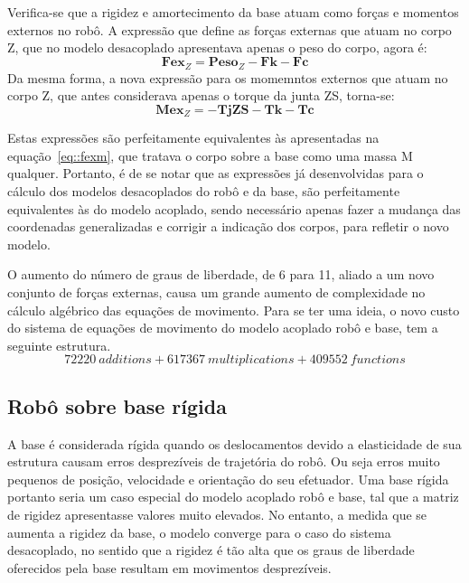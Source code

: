 Verifica-se que a rigidez e amortecimento da base atuam como forças e momentos
externos no robô. A expressão que define as forças externas que atuam no corpo
Z, que no modelo desacoplado apresentava apenas o peso do corpo, agora é:
%
\begin{equation}
	\mathbf{Fex}_Z = \mathbf{Peso}_Z - \mathbf{Fk} - \mathbf{Fc}
\end{equation}
%
Da mesma forma, a nova expressão para os momemntos externos que atuam no corpo
Z, que antes considerava apenas o torque da junta ZS, torna-se:
%
\begin{equation}
	\mathbf{Mex}_Z = -\mathbf{TjZS} - \mathbf{Tk} - \mathbf{Tc}
\end{equation}
%

Estas expressões são perfeitamente equivalentes às apresentadas na
equação~\ref{eq::fexm}, que tratava o corpo sobre a base como uma massa M
qualquer. Portanto, é de se notar que as expressões já desenvolvidas para o
cálculo dos modelos desacoplados do robô e da base, são perfeitamente
equivalentes às do modelo acoplado, sendo necessário apenas fazer a mudança das
coordenadas generalizadas e corrigir a indicação dos corpos, para refletir o
novo modelo.

O aumento do número de graus de liberdade, de 6 para 11, aliado a um novo
conjunto de forças externas, causa um grande aumento de complexidade no
cálculo algébrico das equações de movimento. Para se ter uma ideia, o novo custo
do sistema de equações de movimento do modelo acoplado robô e base, tem a
seguinte estrutura.
%
$$ 72220~\textit{additions} + 617367~\textit{multiplications} + 409552~
\textit{functions} $$
%


\subsection{Robô sobre base rígida}

A base é considerada rígida quando os deslocamentos devido a elasticidade de
sua estrutura causam erros desprezíveis de trajetória do robô. Ou seja erros
muito pequenos de posição, velocidade e orientação do seu efetuador. Uma base
rígida portanto seria um caso especial do modelo acoplado robô e base, tal que a
matriz de rigidez apresentasse valores muito elevados. No entanto, a medida que
se aumenta a rigidez da base, o modelo converge para o caso do sistema
desacoplado, no sentido que a rigidez é tão alta que os graus de liberdade
oferecidos pela base resultam em movimentos desprezíveis.

